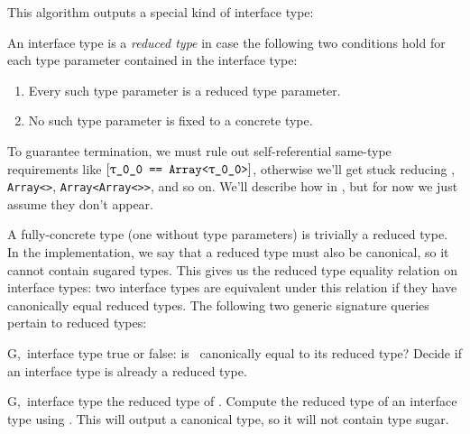 \documentclass[../generics]{subfiles}
\begin{document}
This algorithm outputs a special kind of interface type:

\begin{definition}
An interface type is a \emph{reduced type} in case the following two conditions hold for each type parameter contained in the interface type:
\begin{enumerate}
\item Every such type parameter is a reduced type parameter.
\item No such type parameter is fixed to a concrete type.
\end{enumerate}
\end{definition}

To guarantee termination, we must rule out self-referential same-type requirements like $\SameReq{\rT}{Array<\rT>}$, otherwise we'll get stuck reducing \rT, \texttt{Array<\rT>}, \texttt{Array<Array<\rT>>}, and so on. We'll describe how in , but for now we just assume they don't appear. 

A fully-concrete type (one without type parameters) is trivially a reduced type. In the implementation, we say that a reduced type must also be canonical, so it cannot contain sugared types. This gives us the reduced type equality relation on interface types: two interface types are equivalent under this relation if they have canonically equal reduced types. The following two generic signature queries pertain to reduced types:

\begin{itemize}
{G,\,\tT}
{interface type \tT}
{true or false: is \tT\ canonically equal to its reduced type?}
{Decide if an interface type is already a reduced type.}

{G,\,\tT}
{interface type \tT}
{the reduced type of \tT.}
{Compute the reduced type of an interface type using . This will output a canonical type, so it will not contain type sugar.}
\end{itemize}
\end{document}
